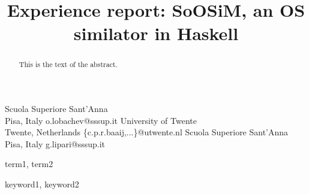 \documentclass[preprint]{sigplanconf}
\newcommand{\soosim}{SoOSiM\xspace}
\begin{document}
\copyrightdata{[to be supplied]} 

\preprintfooter{\today}   %

\title{Experience report: \soosim, an OS similator in Haskell}

           {Scuola Superiore Sant'Anna\\Pisa, Italy}
           {o.lobachev@sssup.it}
           {University of Twente\\Twente, Netherlands}
           {\{c.p.r.baaij,...\}@utwente.nl}
           {Scuola Superiore Sant'Anna\\Pisa, Italy}
           {g.lipari@sssup.it}


\maketitle

\begin{abstract}
This is the text of the abstract.
\end{abstract}


\terms
term1, term2

\keywords
keyword1, keyword2







%
%
\end{document}
